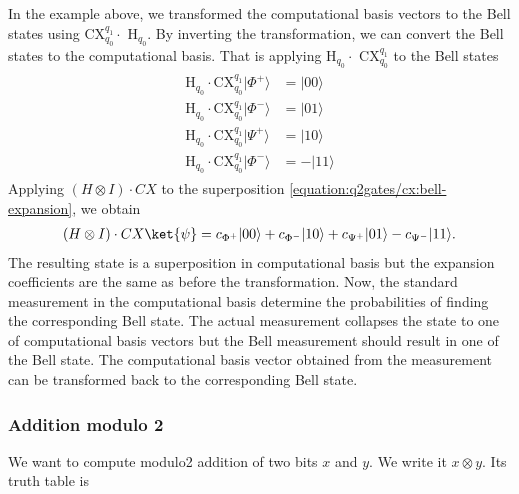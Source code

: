 \documentclass[letterpaper,10pt,english]{jupyterBook}
\begin{document}
\sphinxAtStartPar
In the example above, we transformed the computational basis vectors to the Bell states using CX\(_{q_0}^{q_1} \cdot\) H\(_{q_0}\).  By inverting the transformation, we can convert the Bell states to the computational basis.  That is applying H\(_{q_0} \cdot\) CX\(_{q_0}^{q_1}\) to the Bell states
\begin{equation*}
\begin{split}
\begin{align}
\text{H}_{q_0} \cdot \text{CX}_{q_0}^{q_1} |\Phi^{+}\rangle &= |00\rangle \\
\text{H}_{q_0} \cdot \text{CX}_{q_0}^{q_1} |\Phi^{-}\rangle &= |01\rangle \\
\text{H}_{q_0} \cdot \text{CX}_{q_0}^{q_1} |\Psi^{+}\rangle &= |10\rangle \\
\text{H}_{q_0} \cdot \text{CX}_{q_0}^{q_1} |\Phi^{-}\rangle &= -|11\rangle
\end{align}
\end{split}
\end{equation*}
\sphinxAtStartPar
Applying \((H \otimes I)\cdot CX\) to the superposition \eqref{equation:q2gates/cx:bell-expansion}, we obtain
\begin{equation}\label{equation:q2gates/cx:comp-expansion}
\begin{split}
(H \otimes I)\cdot CX \ket{\psi} = c_{\Phi^+} |00\rangle + c_{\Phi^-} |10\rangle + c_{\Psi^+} |01\rangle - c_{\Psi^-} |11\rangle .
\end{split}
\end{equation}
\sphinxAtStartPar
The resulting state is a superposition in computational basis but the expansion coefficients are the same as before the transformation.
Now, the standard measurement in the computational basis determine the probabilities of finding the corresponding Bell state.  The actual measurement collapses the state to one of computational basis vectors but the Bell measurement should result in one of the Bell state.
The computational basis vector obtained from the measurement can be transformed back to the corresponding Bell state.


\subsubsection{Addition modulo 2}
\label{\detokenize{q2gates/cx:addition-modulo-2}}
\sphinxAtStartPar
We want to compute modulo\sphinxhyphen{}2 addition of two bits \(x\) and \(y\). We write it \(x \otimes y\).  Its truth table is
\end{document}
